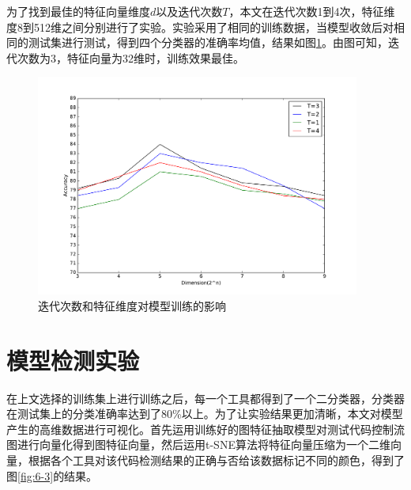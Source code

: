 为了找到最佳的特征向量维度$d$以及迭代次数$T$，本文在迭代次数1到4次，特征维度8到512维之间分别进行了实验。实验采用了相同的训练数据，当模型收敛后对相同的测试集进行测试，得到四个分类器的准确率均值，结果如图\ref{mid}。由图可知，迭代次数为3，特征向量为32维时，训练效果最佳。
\begin{figure}[htbp]
	\begin{center}
		\includegraphics[width=0.95\textwidth]{figures/9.pdf}
		\caption{迭代次数和特征维度对模型训练的影响}
		\label{mid}
	\end{center}
\end{figure}
\section{模型检测实验}
在上文选择的训练集上进行训练之后，每一个工具都得到了一个二分类器，分类器在测试集上的分类准确率达到了80\%以上。为了让实验结果更加清晰，本文对模型产生的高维数据进行可视化。首先运用训练好的图特征抽取模型对测试代码控制流图进行向量化得到图特征向量，然后运用t-SNE算法将特征向量压缩为一个二维向量，根据各个工具对该代码检测结果的正确与否给该数据标记不同的颜色，得到了图\ref{fig:6-3}的结果。


